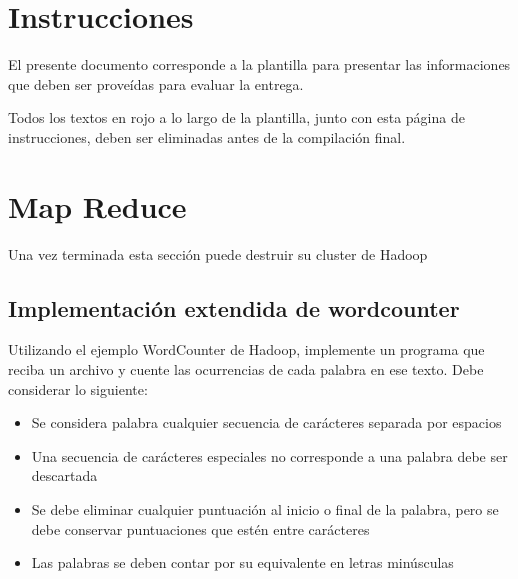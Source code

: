 \documentclass[12pt,letterpaper,twoside]{article}
\begin{document}

{\color{red}
\section*{Instrucciones}

El presente documento corresponde a la plantilla para presentar las informaciones que deben ser proveídas para evaluar la entrega.

Todos los textos en rojo a lo largo de la plantilla, junto con esta página de instrucciones, deben ser eliminadas antes de la compilación final.

\newpage
}


\section{Map Reduce}

 {\color{red} Una vez terminada esta sección puede destruir su cluster de Hadoop}

\subsection{Implementación extendida de wordcounter}

{\color{red} Utilizando el ejemplo WordCounter de Hadoop, implemente un programa que reciba un archivo y cuente las ocurrencias de cada palabra en ese texto. Debe considerar lo siguiente:
    \begin{itemize}
        \item Se considera palabra cualquier secuencia de carácteres separada por espacios
        \item Una secuencia de carácteres especiales no corresponde a una palabra debe ser descartada
        \item Se debe eliminar cualquier puntuación al inicio o final de la palabra, pero se debe conservar puntuaciones que estén entre carácteres
        \item Las palabras se deben contar por su equivalente en letras minúsculas
    \end{itemize}
}
\end{document}
